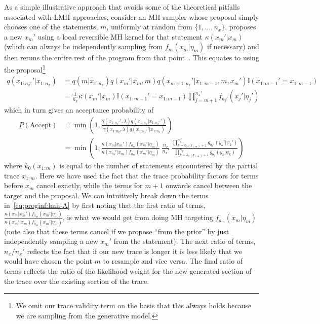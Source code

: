 As a simple illustrative approach that avoids some of the theoretical pitfalls associated
with LMH approaches, consider an MH sampler whose proposal simply chooses one
of the \sample statements, $m$, uniformly at random from $\{1,\dots,n_x\}$, proposes
 a new $x_m'$ using a local reversible
MH kernel for that \sample statement $\kappa(x_m' | x_{m})$ (which can always be independently sampling
from $f_m(x_m|\eta_m)$ if necessary) and then reruns the entire rest of the program
from that point~\citep{wood2014new}.  This equates to using the 
proposal\footnote{We omit our trace validity term on the
basis that this always holds because we are sampling from the generative model.}
\begin{align}
q(x_{1:n_x'}' | x_{1:n_x}) &= q(m|x_{1:n_x}) q(x_m' | x_{m}, m) q(x_{m+1:n_x}' | x_{1:m-1}, m, x_m') \mathbb{I}(x_{1:m-1}'=x_{1:m-1}) \nonumber \\
&=\frac{1}{n_x} \kappa(x_m' | x_{m}) \mathbb{I}(x_{1:m-1}'=x_{1:m-1})  \prod_{j=m+1}^{n_x'} f_{a_{j}'} (x_{j}' | \eta_{j}')
\end{align}
which in turn gives an acceptance probability of
\begin{align}
P(\text{Accept}) &= \min\left(1, \frac{\gamma(x_{1:n_x'}',\lambda) q(x_{1:n_x} | x_{1:n_x'}') }
{\gamma(x_{1:n_x},\lambda) q(x_{1:n_x'}' | x_{1:n_x}) }\right) \nonumber\\
&= \min\left(1, \frac{\kappa(x_m | x_{m}') f_{a_m} (x_m' | \eta_m)} {\kappa(x_m' | x_{m}) f_{a_m} (x_m' | \eta_m)} \;
\frac{n_x}{n_x'} \; \frac{\prod_{k=k_0(x_{1:m})+1}^{n_y'} g_{b_{k}'} (y_{k}' | \psi_{k}')}
{\prod_{k=k_0(x_{1:m})+1}^{n_y} g_{b_{k}} (y_{k} | \psi_{k}) }\right) \label{eq:proginf:lmh-A}
\end{align}
where $k_0(x_{1:m})$ is equal to the number of \observe statements encountered by the partial
trace $x_{1:m}$.  Here we have used the fact that the trace probability factors for terms 
before $x_m$ cancel
exactly, while the \sample terms for $m+1$ onwards cancel between the target and the proposal.
We can intuitively break down the terms in~\eqref{eq:proginf:lmh-A} by first noting that the first
ratio of terms, $\frac{\kappa(x_m | x_{m}') f_{a_m} (x_m' | \eta_m)} {\kappa(x_m' | x_{m}) f_{a_m} (x_m' | \eta_m)}$, is what we would get from
doing MH targeting $f_{a_m}(x_m|\eta_m)$ (note also that these terms cancel if we propose ``from the 
prior'' by just independently sampling a new $x_m'$ from the \sample statement).  The next ratio of terms,
$n_x / n_x'$ reflects the fact that if our new trace is longer it is less likely that we would have chosen the
point $m$ to resample and vice versa.  The final ratio of terms reflects the ratio of the likelihood weight
for the new generated section of the trace over the existing section of the trace.

